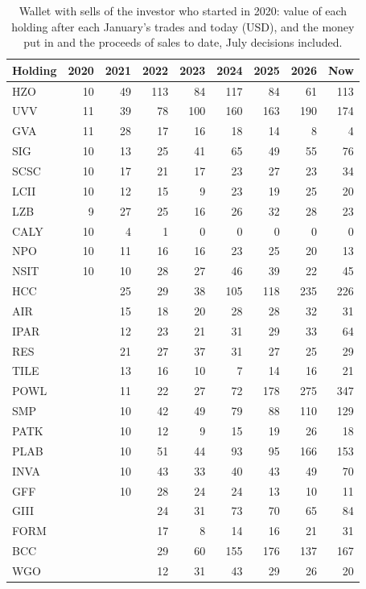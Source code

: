 \documentclass[11pt,a4paper]{article}
\begin{document}
{\small
\begin{longtable}{l r r r r r r r r }
\caption{Wallet with sells of the investor who started in 2020: value of each holding after each January's trades and today (USD), and the money put in and the proceeds of sales to date, July decisions included.}\label{tab:contents}\\
\hline
Holding & 2020 & 2021 & 2022 & 2023 & 2024 & 2025 & 2026 & Now \\
\hline
\endhead
HZO & 10 & 49 & 113 & 84 & 117 & 84 & 61 & 113 \\
UVV & 11 & 39 & 78 & 100 & 160 & 163 & 190 & 174 \\
GVA & 11 & 28 & 17 & 16 & 18 & 14 & 8 & 4 \\
SIG & 10 & 13 & 25 & 41 & 65 & 49 & 55 & 76 \\
SCSC & 10 & 17 & 21 & 17 & 23 & 27 & 23 & 34 \\
LCII & 10 & 12 & 15 & 9 & 23 & 19 & 25 & 20 \\
LZB & 9 & 27 & 25 & 16 & 26 & 32 & 28 & 23 \\
CALY & 10 & 4 & 1 & 0 & 0 & 0 & 0 & 0 \\
NPO & 10 & 11 & 16 & 16 & 23 & 25 & 20 & 13 \\
NSIT & 10 & 10 & 28 & 27 & 46 & 39 & 22 & 45 \\
HCC &  & 25 & 29 & 38 & 105 & 118 & 235 & 226 \\
AIR &  & 15 & 18 & 20 & 28 & 28 & 32 & 31 \\
IPAR &  & 12 & 23 & 21 & 31 & 29 & 33 & 64 \\
RES &  & 21 & 27 & 37 & 31 & 27 & 25 & 29 \\
TILE &  & 13 & 16 & 10 & 7 & 14 & 16 & 21 \\
POWL &  & 11 & 22 & 27 & 72 & 178 & 275 & 347 \\
SMP &  & 10 & 42 & 49 & 79 & 88 & 110 & 129 \\
PATK &  & 10 & 12 & 9 & 15 & 19 & 26 & 18 \\
PLAB &  & 10 & 51 & 44 & 93 & 95 & 166 & 153 \\
INVA &  & 10 & 43 & 33 & 40 & 43 & 49 & 70 \\
GFF &  & 10 & 28 & 24 & 24 & 13 & 10 & 11 \\
GIII &  &  & 24 & 31 & 73 & 70 & 65 & 84 \\
FORM &  &  & 17 & 8 & 14 & 16 & 21 & 31 \\
BCC &  &  & 29 & 60 & 155 & 176 & 137 & 167 \\
WGO &  &  & 12 & 31 & 43 & 29 & 26 & 20 \\

\end{longtable}}
\end{document}
